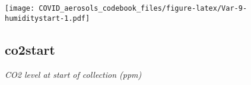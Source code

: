 \documentclass[]{article}
\begin{document}
\begin{minipage}{0.25 \textwidth}

\texttt{[image: COVID\_aerosols\_codebook\_files/figure-latex/Var-9-humiditystart-1.pdf]}

\end{minipage}

\noindent\makebox[\linewidth]{\rule{\textwidth}{0.4pt}}

\hypertarget{co2start}{%
\subsection{co2start}\label{co2start}}

\emph{CO2 level at start of collection (ppm)}

\begin{minipage}{0.75 \textwidth}


\end{minipage}
\end{document}
